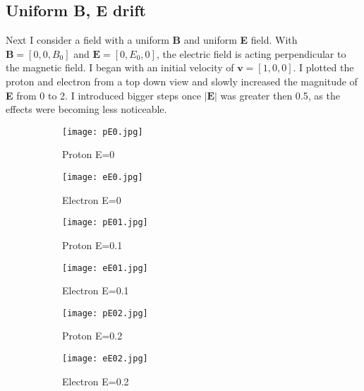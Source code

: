 \documentclass[14paper,11pt,hidelinks]{article}
\begin{document}
\subsection{Uniform B, E drift}
Next I consider a field with a uniform \textbf{B} and uniform \textbf{E} field. With \begin{math} \mathbf{B}=[0,0,B_0] \end{math} and \begin{math} \mathbf{E}=[0,E_0,0] \end{math}, the electric field is acting perpendicular to the magnetic field. I began with an initial velocity of \begin{math} \mathbf{v}=[1,0,0] \end{math}. I plotted the proton and electron from a top down view and slowly increased the magnitude of \textbf{E} from 0 to 2. I introduced bigger steps once \begin{math} |\mathbf{E}| \end{math} was greater then 0.5, as the effects were becoming less noticeable. 
\newline
\begin{figure}[h!]
\centering
\begin{subfigure}[b]{0.3\linewidth}
\texttt{[image: pE0.jpg]} 
\caption*{Proton E=0}
\end{subfigure}
\begin{subfigure}[b]{0.3\linewidth}
\texttt{[image: eE0.jpg]}
\caption*{Electron E=0}
\end{subfigure}
\caption{}
\end{figure}
\begin{figure}[h!]
\centering
\begin{subfigure}[b]{0.3\linewidth}
\texttt{[image: pE01.jpg]} 
\caption*{Proton E=0.1}
\end{subfigure}
\begin{subfigure}[b]{0.3\linewidth}
\texttt{[image: eE01.jpg]}
\caption*{Electron E=0.1}
\end{subfigure}
\caption{}
\end{figure}
\begin{figure}[h!]
\centering
\begin{subfigure}[b]{0.3\linewidth}
\texttt{[image: pE02.jpg]} 
\caption*{Proton E=0.2}
\end{subfigure}
\begin{subfigure}[b]{0.3\linewidth}
\texttt{[image: eE02.jpg]}
\caption*{Electron E=0.2}
\end{subfigure}
\caption{}
\end{figure}
\end{document}
